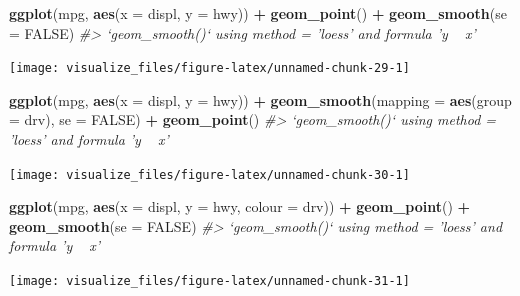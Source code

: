 \documentclass[]{book}
\newenvironment{Shaded}{\begin{snugshade}}{\end{snugshade}}
\newcommand{\CommentTok}[1]{\textcolor[rgb]{0.56,0.35,0.01}{\textit{#1}}}
\newcommand{\DataTypeTok}[1]{\textcolor[rgb]{0.13,0.29,0.53}{#1}}
\newcommand{\KeywordTok}[1]{\textcolor[rgb]{0.13,0.29,0.53}{\textbf{#1}}}
\newcommand{\NormalTok}[1]{#1}
\newcommand{\OperatorTok}[1]{\textcolor[rgb]{0.81,0.36,0.00}{\textbf{#1}}}
\newcommand{\OtherTok}[1]{\textcolor[rgb]{0.56,0.35,0.01}{#1}}
\newcommand{\StringTok}[1]{\textcolor[rgb]{0.31,0.60,0.02}{#1}}
\theoremstyle{plain}
\theoremstyle{remark}
\begin{document}
\begin{Shaded}
\begin{Highlighting}[]
\KeywordTok{ggplot}\NormalTok{(mpg, }\KeywordTok{aes}\NormalTok{(}\DataTypeTok{x =}\NormalTok{ displ, }\DataTypeTok{y =}\NormalTok{ hwy)) }\OperatorTok{+}
\StringTok{  }\KeywordTok{geom_point}\NormalTok{() }\OperatorTok{+}
\StringTok{  }\KeywordTok{geom_smooth}\NormalTok{(}\DataTypeTok{se =} \OtherTok{FALSE}\NormalTok{)}
\CommentTok{#> `geom_smooth()` using method = 'loess' and formula 'y ~ x'}
\end{Highlighting}
\end{Shaded}

\begin{center}\texttt{[image: visualize\_files/figure-latex/unnamed-chunk-29-1]} \end{center}

\begin{Shaded}
\begin{Highlighting}[]
\KeywordTok{ggplot}\NormalTok{(mpg, }\KeywordTok{aes}\NormalTok{(}\DataTypeTok{x =}\NormalTok{ displ, }\DataTypeTok{y =}\NormalTok{ hwy)) }\OperatorTok{+}
\StringTok{  }\KeywordTok{geom_smooth}\NormalTok{(}\DataTypeTok{mapping =} \KeywordTok{aes}\NormalTok{(}\DataTypeTok{group =}\NormalTok{ drv), }\DataTypeTok{se =} \OtherTok{FALSE}\NormalTok{) }\OperatorTok{+}
\StringTok{  }\KeywordTok{geom_point}\NormalTok{()}
\CommentTok{#> `geom_smooth()` using method = 'loess' and formula 'y ~ x'}
\end{Highlighting}
\end{Shaded}

\begin{center}\texttt{[image: visualize\_files/figure-latex/unnamed-chunk-30-1]} \end{center}

\begin{Shaded}
\begin{Highlighting}[]
\KeywordTok{ggplot}\NormalTok{(mpg, }\KeywordTok{aes}\NormalTok{(}\DataTypeTok{x =}\NormalTok{ displ, }\DataTypeTok{y =}\NormalTok{ hwy, }\DataTypeTok{colour =}\NormalTok{ drv)) }\OperatorTok{+}
\StringTok{  }\KeywordTok{geom_point}\NormalTok{() }\OperatorTok{+}
\StringTok{  }\KeywordTok{geom_smooth}\NormalTok{(}\DataTypeTok{se =} \OtherTok{FALSE}\NormalTok{)}
\CommentTok{#> `geom_smooth()` using method = 'loess' and formula 'y ~ x'}
\end{Highlighting}
\end{Shaded}

\begin{center}\texttt{[image: visualize\_files/figure-latex/unnamed-chunk-31-1]} \end{center}
\end{document}
